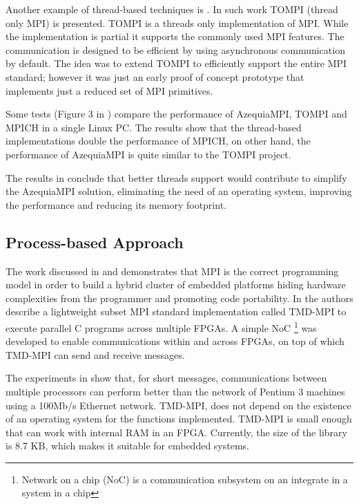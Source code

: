 Another example of thread-based techniques is \cite{Demaine}. In such work
TOMPI (thread only MPI) is presented. TOMPI is a threads only implementation of
MPI. While the implementation is partial it supports the commonly used MPI
features. The communication is designed to be efficient by using asynchronous
communication by default. The idea was to extend TOMPI to efficiently support
the entire MPI standard; however it was just an early proof of concept
prototype that implements just a reduced set of MPI primitives. 

Some tests (Figure 3 in \cite{Gallego}) compare the performance of AzequiaMPI,
TOMPI and MPICH in a single Linux PC. The results show that the thread-based
implementations double the performance of MPICH, on other hand, the performance
of AzequiaMPI is quite similar to the TOMPI project. 

The results in \cite{Gallego} conclude that better threads support would
contribute to simplify the AzequiaMPI solution, eliminating the need of an
operating system, improving the performance and reducing its memory footprint. 

\subsection{Process-based Approach}

The work discussed in \cite{Saldana-Chow} and \cite{Williams} demonstrates that
MPI is the correct programming model in order to build a hybrid cluster of
embedded platforms hiding hardware complexities from the programmer and
promoting code portability. In \cite{Saldana-Chow} the authors describe a
lightweight subset MPI standard implementation called TMD-MPI to execute
parallel C programs across multiple FPGAs. A simple NoC \footnote{Network on a
chip (NoC) is a communication subsystem on an integrate in a system in a chip}
was developed to enable communications within and across FPGAs, on top of which
TMD-MPI can send and receive messages. 

The experiments in \cite{Saldana-Chow}  show that, for short messages,
communications between multiple processors can perform better than the network
of Pentium 3 machines using a 100Mb/s Ethernet network. TMD-MPI, does not
depend on the existence of an operating system for the functions implemented.
TMD-MPI is small enough that can work with internal RAM in an FPGA. Currently,
the size of the library is 8.7 KB, which makes it suitable for embedded
systems.

